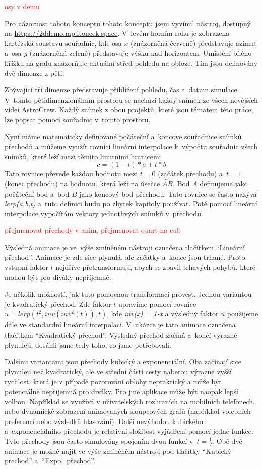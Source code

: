 \documentclass[12pt,a4paper,titlepage]{article}
\begin{document}
\textcolor{red}{osy v demu}

Pro názornost tohoto konceptu tohoto konceptu jsem vyvinul nástroj, dostupný na \url{https://2ddemo.mp.itoncek.space}. V~levém horním rohu je zobrazena kartézská soustavu souřadnic, kde osa $x$ (znázorněná červeně) představuje azimut a~osa $y$ (znázorněná zeleně) představuje výšku nad horizontem. Umístění bílého křížku na grafu znázorňuje aktuální střed pohledu na obloze. Tím jsou definovány dvě dimenze z pěti.

Zbývající tři dimenze představuje přiblížení pohledu, čas a~datum simulace. V~tomto pětidimenzionálním prostoru se nachází každý snímek ze všech novějších videí AstroCrew. Každý snímek z obou projektů, které jsou tématem této práce, lze popsat pomocí souřadnic v~tomto prostoru.

Nyní máme matematicky definované počáteční a~koncové souřadnice snímků přechodů a můžeme využít rovnici lineární interpolace k~výpočtu souřadnic všech snímků, které leží mezi těmito limitními hranicemi.
\[c = (1-t)*a + t * b\] 
Tato rovnice převede každou hodnotu mezi $t=0$ (začátek přechodu) a~$t=1$ (konec přechodu) na hodnotu, která leží na úsečce $\overleftrightarrow{AB}$. Bod $A$ definujeme jako počáteční bod a~bod $B$ jako koncový bod přechodu. Tato rovnice se často nazývá \textit{lerp(a,b,t)} a~tuto definici budu po zbytek kapitoly používat. Poté pomocí lineární interpolace vypočítám vektory jednotlivých snímků v~přechodu.%

\textcolor{red}{přejmenovat přechody v anim, přejmenovat quart na cub}

Výsledná animace je ve~výše zmíněném nástroji označena tlačítkem \enquote{Lineární přechod}. Animace je zde sice plynulá, ale začátky a~konce jsou trhané. Proto vstupní faktor $t$ nejdříve přetransformuji, abych se zbavil trhavých pohybů, které mohou být pro diváky nepříjemné. 

Je několik možností, jak tuto pomocnou transformaci provést. Jednou variantou je kvadratický přechod. Zde faktor $t$ upravíme pomocí rovnice $u = lerp({t}^{2}, inv({inv}^{2}(t)), t)$, kde \textit{inv(x) = 1-x} a výsledný faktor $u$ použijeme dále ve standardní lineární interpolaci.  V~ukázce je tato animace označena tlačítkem \enquote{Kvadratický přechod}. Výsledný přechod začíná a~končí výrazně plynuleji, dosáhli jsme tedy toho, co jsme potřebovali. %

Dalšími variantami jsou přechody kubický a exponenciální. Oba začínají sice plynuleji než kvadratický, ale ve střední části cesty naberou výrazně vyšší rychlost, která je v případě pozorování oblohy nepraktický a může být potenciálně nepříjemná pro diváky. Pro jiné aplikace může být naopak lepší volbou. Například se využívá v uživatelských rozhraních na mobilních telefonech, nebo dynamické zobrazení animovaných sloupcových grafů (například volebních preferencí nebo výsledků hlasování). Další nevýhodou kubického a~exponenciálního přechodu je relativní složitost vyjádření pomocí jedné funkce. Tyto přechody jsou často simulovány spojením dvou funkcí v~$t=\frac{1}{2}$. Obě dvě animace je možné najít ve výše zmíněném nástroji pod tlačítky \enquote{Kubický přechod} a~\enquote{Expo.\ přechod}.
\end{document}
